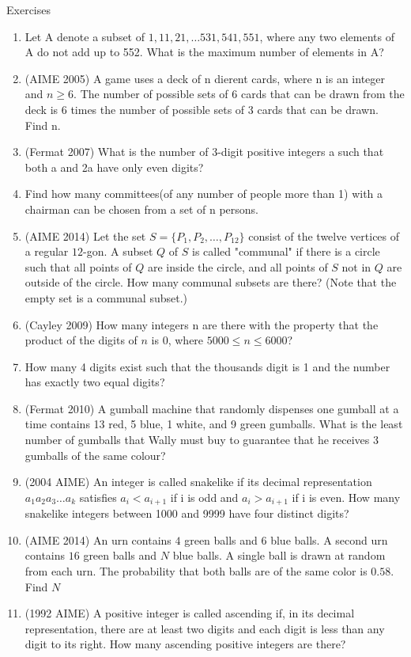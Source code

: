 \begin{xcb}{Exercises}
\begin{enumerate}
\item Let A denote a subset of ${1,11,21, \dots 531,541,551}$, where any two elements of A do not add up to 552. What is the maximum number of elements in A?
\item (AIME 2005) A game uses a deck of n dierent cards, where n is an integer and $n \geq 6$. The number of possible sets of 6 cards that can be drawn from the deck is 6 times the number of possible sets of 3 cards that can be drawn. Find n.
\item (Fermat 2007) What is the number of 3-digit positive integers a such that both a and 2a have only even digits?
\item Find how many committees(of any number of people more than 1) with a chairman can be chosen from a set of n persons.
\item (AIME 2014) Let the set $S = \{P_1, P_2, \dots, P_{12}\}$ consist of the twelve vertices of a regular $12$-gon. A subset $Q$ of $S$ is called "communal" if there is a circle such that all points of $Q$ are inside the circle, and all points of $S$ not in $Q$ are outside of the circle. How many communal subsets are there? (Note that the empty set is a communal subset.)
\item (Cayley 2009) How many integers n are there with the property that the product of the digits of $n$ is $0$, where $5000 \leq n \leq 6000$?
\item How many 4 digits exist such that the thousands digit is 1 and the number has exactly two equal digits?
\item (Fermat 2010) A gumball machine that randomly dispenses one gumball at a time contains 13 red, 5 blue, 1 white, and 9 green gumballs. What is the least number of gumballs that Wally must buy to guarantee that he receives 3 gumballs of the same colour?
\item (2004 AIME) An integer is called snakelike if its decimal representation $a_1a_2a_3 \dots a_k$ satisfies $a_i < a_{i+1}$  if i is odd and $a_i > a_{i+1}$ if i is even. How many snakelike integers between 1000 and 9999 have four distinct digits?
\item (AIME 2014) An urn contains $4$ green balls and $6$ blue balls. A second urn contains $16$ green balls and $N$ blue balls. A single ball is drawn at random from each urn. The probability that both balls are of the same color is $0.58$. Find $N$
\item (1992 AIME) A positive integer is called ascending if, in its decimal representation, there are at least two digits and each digit is less than any digit to its right. How many ascending positive integers are there?

\end{enumerate}
\end{xcb}
